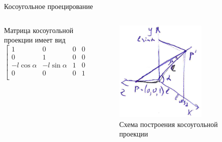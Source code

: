 \documentclass{beamer}
\begin{document}
	\begin{frame}{Косоугольное проецирование}
		\begin{columns}
			\begin{column}{0.5\textwidth}
				Матрица косоугольной проекции имеет вид
				\[
					\begin{bmatrix}
						1 & 0 & 0 & 0 \\
						0 & 1 & 0 & 0 \\
						-l \cos \alpha & - l \sin \alpha & 1 & 0 \\
						0 & 0 & 0 & 1 \\
					\end{bmatrix}	
				\]
			\end{column}
			\begin{column}{0.5\textwidth}
				\begin{figure} 
						\includegraphics[width=0.7\textwidth]{images/oblique_sceme.png}
					\caption{Схема построения косоугольной проекции}
				\end{figure}
			\end{column}
		\end{columns}
\end{frame}
\end{document}
